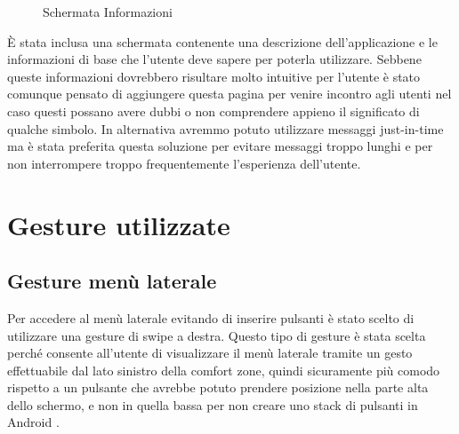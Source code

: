 \begin{figure}[htp]
	\centering
	 \quad
	\caption{Schermata Informazioni}
	\label{fig:Informazioni}
\end{figure}

È stata inclusa una schermata contenente una descrizione dell'applicazione e le informazioni di base che l'utente deve sapere per poterla utilizzare. Sebbene queste informazioni dovrebbero risultare molto intuitive per l'utente è stato comunque pensato di aggiungere questa pagina per venire incontro agli utenti nel caso questi possano avere dubbi o non comprendere appieno il significato di qualche simbolo. In alternativa avremmo potuto utilizzare messaggi just-in-time ma è stata preferita questa soluzione per evitare messaggi troppo lunghi e per non interrompere troppo frequentemente l'esperienza dell'utente.

\pagebreak

\section{Gesture utilizzate\label{sec:gesture}}

\subsection{Gesture menù laterale}
Per accedere al menù laterale evitando di inserire pulsanti è stato scelto di utilizzare una gesture di swipe a destra. Questo tipo di gesture è stata scelta perché consente all'utente di visualizzare il menù laterale tramite un gesto effettuabile dal lato sinistro della comfort zone, quindi sicuramente più comodo rispetto a un pulsante che avrebbe potuto prendere posizione nella parte alta dello schermo, e non in quella bassa per non creare uno stack di pulsanti in Android \parencite{gaggi:mobileDesign}.


